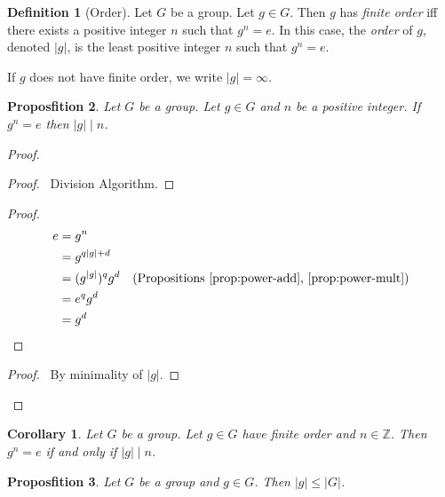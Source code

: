 \documentclass{book}
\let\qed\relax
\newtheorem{prop}{Proposfition}[chapter]
\newtheorem{cor}{Corollary}[prop]
\theoremstyle{definition}
\newtheorem{df}[prop]{Definition}
\begin{document}
\begin{df}[Order]
    Let $G$ be a group. Let $g \in G$. Then $g$ has \emph{finite order} iff there exists a positive integer $n$ such that $g^n = e$. In this case, the \emph{order} of $g$, denoted $|g|$, is the least positive integer $n$ such that $g^n = e$.

    If $g$ does not have finite order, we write $|g| = \infty$.
\end{df}

\begin{prop}
    Let $G$ be a group. Let $g \in G$ and $n$ be a positive integer. If $g^n = e$ then $|g| \mid n$.
\end{prop}

\begin{proof}
    \pf
    \begin{proof}
        \pf\ Division Algorithm.
    \end{proof}
    \begin{proof}
        \pf
        \begin{align*}
            e & = g^n                                                                                 \\
              & = g^{q|g| + d}                                                                        \\
              & = (g^{|g|})^q g^d & (\text{Propositions \ref{prop:power-add}, \ref{prop:power-mult}}) \\
              & = e^q g^d                                                                             \\
              & = g^d
        \end{align*}
    \end{proof}
    \begin{proof}
        \pf\ By minimality of $|g|$.
    \end{proof}
    \qed
\end{proof}

\begin{cor}
    \label{cor:order-divides}
    Let $G$ be a group. Let $g \in G$ have finite order and $n \in \mathbb{Z}$. Then $g^n = e$ if and only if $|g| \mid n$.
\end{cor}

\begin{prop}
    Let $G$ be a group and $g \in G$. Then $|g| \leq |G|$.
\end{prop}
\end{document}
